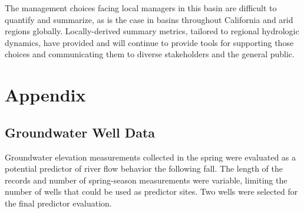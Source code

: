 \documentclass[hess, manuscript]{copernicus}
\begin{document}
The management choices facing local managers in this basin are difficult
to quantify and summarize, as is the case in basins throughout
California and arid regions globally. Locally-derived summary metrics,
tailored to regional hydrologic dynamics, have provided and will
continue to provide tools for supporting those choices and communicating
them to diverse stakeholders and the general public.

\newpage

\section{Appendix}

\appendixfigures
\appendixtables

\subsection{Groundwater Well Data}

Groundwater elevation measurements collected in the spring were
evaluated as a potential predictor of river flow behavior the following
fall. The length of the records and number of spring-season measurements
were variable, limiting the number of wells that could be used as
predictor sites. Two wells were selected for the final predictor
evaluation.
\end{document}
